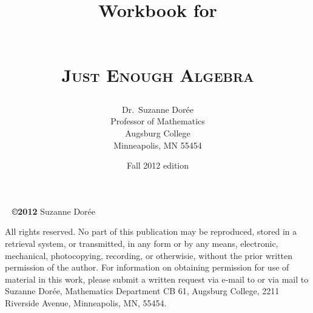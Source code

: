 \documentclass[11pt]{book}
\begin{document}

\title{\textbf{Workbook for}\\ ~ \\ \begin{Huge} \textsc{Just Enough Algebra}\end{Huge} }
\author{Dr.\ Suzanne Dor\'ee \\ Professor of Mathematics\\Augsburg College\\Minneapolis, MN 55454}
\date{Fall 2012 edition}
\maketitle

\newpage %

~\vfill 
\noindent \textbf{\copyright 2012} Suzanne Dor\'ee  

\noindent All rights reserved.  No part of this publication may be reproduced, stored in a retrieval system, or transmitted, in any form or by any means, electronic, mechanical, photocopying, recording, or otherwisie, without the prior written permission of the author.  For information on obtaining permission for use of material in this work, please submit a written request via e-mail to  or via mail to Suzanne Dor\'ee, Mathematics Department CB 61, Augsburg College, 2211 Riverside Avenue, Minneapolis, MN, 55454. 

\tableofcontents

 
       
       
       
       
       
      

       
       
       
       
       
    

       
       
       
      
       
    
    
      
      
      
      
     


       
      
      
      
      
      
\end{document}
